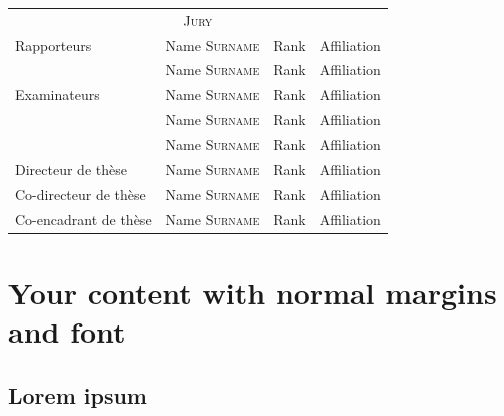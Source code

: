 \documentclass[10pt]{article}
\newenvironment{cover}{%
  \fontfamily{phv}\selectfont %
  \pagestyle{empty} %
}{%
  \addtocounter{page}{-1}
  \cleardoublepage
}
\begin{document}
\begin{cover}

  \noindent
  \begin{tabular}{llll} %
    \multicolumn{4}{c}{\scshape\color{teal}\Large Jury} \\[10pt]
    Rapporteurs & Name \textsc{Surname} & Rank & Affiliation\\
                & Name \textsc{Surname} & Rank & Affiliation \\[10pt]
    Examinateurs & Name \textsc{Surname} & Rank & Affiliation
    \\
                & Name \textsc{Surname} & Rank & Affiliation \\
                & Name \textsc{Surname} & Rank & Affiliation \\[10pt]
    Directeur de thèse & Name \textsc{Surname} & Rank & Affiliation \\
    Co-directeur de thèse & Name \textsc{Surname} & Rank & Affiliation \\
    Co-encadrant de thèse & Name \textsc{Surname} & Rank & Affiliation 
  \end{tabular}
\end{cover}


\section*{Your content with normal margins and font}
\subsection*{Lorem ipsum}
\lipsum
\pagebreak
\end{document}
